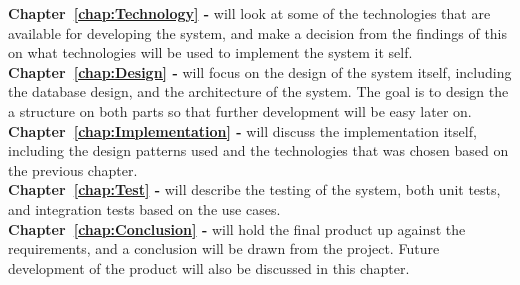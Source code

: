 \textbf{Chapter~\ref{chap:Technology} - } will look at some of the technologies that are available for developing the system, and make a decision from the findings of this on what technologies will be used to implement the system it self.\\

\textbf{Chapter~\ref{chap:Design} - } will focus on the design of the system itself, including the database design, and the architecture of the system. The goal is to design the a structure on both parts so that further development will be easy later on.\\

\textbf{Chapter~\ref{chap:Implementation} - } will discuss the implementation itself, including the design patterns used and the technologies that was chosen based on the previous chapter.\\

\textbf{Chapter~\ref{chap:Test} - } will describe the testing of the system, both unit tests, and integration tests based on the use cases.\\

\textbf{Chapter~\ref{chap:Conclusion} - } will hold the final product up against the requirements, and a conclusion will be drawn from the project. Future development of the product will also be discussed in this chapter.
